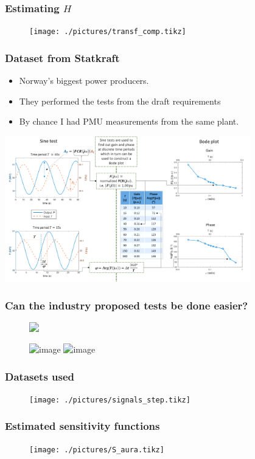 \begin{frame}
	\frametitle{Estimating $H$}
	\begin{figure}
			\texttt{[image: ./pictures/transf\_comp.tikz]}
	\end{figure}
\end{frame}
\begin{frame}
	\frametitle{Dataset from Statkraft}
	\begin{itemize}[<+->]
		\item Norway's biggest power producers.
		\item They performed the tests from the draft requirements
		\item By chance I had PMU measurements from the same plant.
		\end{itemize}
		\includegraphics[width=0.8\textwidth]{./pictures/tests.png}
\end{frame}
\begin{frame}
	\frametitle{Can the industry proposed tests be done easier?}
	\begin{figure}
		\includegraphics<1->[width=0.6\textwidth]{./pictures/aura_signals.tikz}
	\end{figure}
	\begin{figure}
		\includegraphics<1>[width=0.6\textwidth]{./pictures/frd.tikz}
		\includegraphics<2>[width=0.6\textwidth]{./pictures/frd_vs_bj.tikz}
	\end{figure}
\end{frame}
\begin{frame}
	\frametitle{Datasets used}
	\begin{figure}
			\texttt{[image: ./pictures/signals\_step.tikz]}
	\end{figure}
\end{frame}
\begin{frame}
	\frametitle{Estimated sensitivity functions}
		\begin{figure}[tb]
			\texttt{[image: ./pictures/S\_aura.tikz]}
		\end{figure}
\end{frame}

